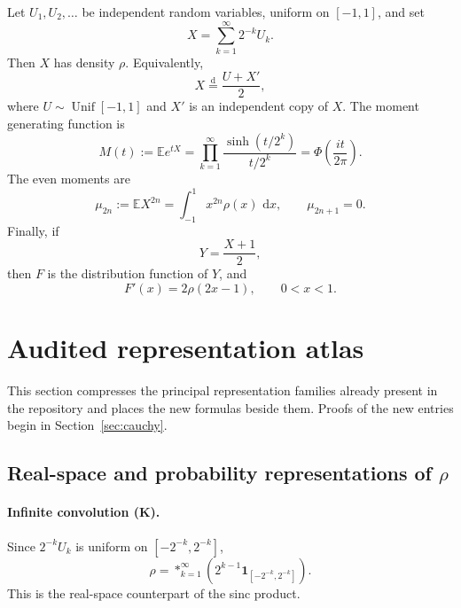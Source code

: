 \documentclass[11pt]{article}
\theoremstyle{definition}
\theoremstyle{remark}
\newcommand{\E}{\mathbb E}
\newcommand{\dd}{\,\mathrm d}
\newcommand{\one}{\mathbf 1}
\newcommand{\statusknown}{\textsf{K}}
\begin{document}
Let \(U_1,U_2,\dots\) be independent random variables, uniform on \([-1,1]\), and set
\begin{equation}
 X=\sum_{k=1}^{\infty}2^{-k}U_k.                              \label{eq:X-series}
\end{equation}
Then \(X\) has density \(\rho\).  Equivalently,
\begin{equation}
 X\overset{\mathrm d}=\frac{U+X'}2,                           \label{eq:X-fixed-point}
\end{equation}
where \(U\sim\operatorname{Unif}[-1,1]\) and \(X'\) is an independent copy of \(X\).
The moment generating function is
\begin{equation}
 M(t):=\E e^{tX}
 =\prod_{k=1}^{\infty}\frac{\sinh(t/2^k)}{t/2^k}
 =\Phi\!\left(\frac{it}{2\pi}\right).                       \label{eq:M-product}
\end{equation}
The even moments are
\begin{equation}
 \mu_{2n}:=\E X^{2n}=\int_{-1}^{1}x^{2n}\rho(x)\,\dd x,
 \qquad \mu_{2n+1}=0.                                      \label{eq:moments}
\end{equation}
Finally, if
\begin{equation}
 Y=\frac{X+1}{2},                                             \label{eq:Y-affine}
\end{equation}
then \(F\) is the distribution function of \(Y\), and
\begin{equation}
 F'(x)=2\rho(2x-1),\qquad 0<x<1.                              \label{eq:F-density}
\end{equation}

\section{Audited representation atlas}

This section compresses the principal representation families already present in the
repository and places the new formulas beside them.  Proofs of the new entries begin in
Section~\ref{sec:cauchy}.

\subsection{Real-space and probability representations of \(\rho\)}

\paragraph{Infinite convolution (\statusknown).}
Since \(2^{-k}U_k\) is uniform on \([-2^{-k},2^{-k}]\),
\begin{equation}
 \rho=\mathop{\ast}_{k=1}^{\infty}
 \left(2^{k-1}\one_{[-2^{-k},2^{-k}]}\right).                \label{eq:rho-convolution}
\end{equation}
This is the real-space counterpart of the sinc product.
\end{document}

